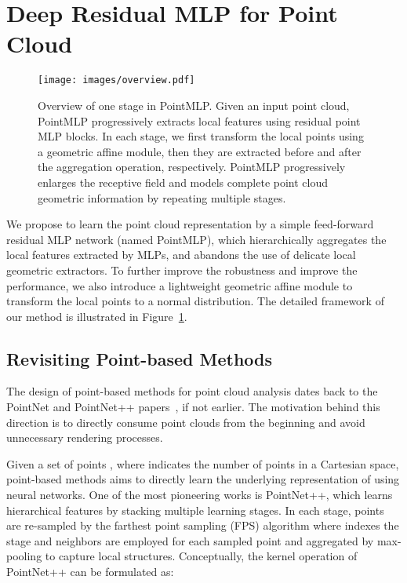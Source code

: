 \documentclass{article} \usepackage{iclr2022_conference,times}
\begin{document}
\section{Deep Residual MLP for Point Cloud}
\label{sec:pointmlp}

\begin{figure}
    \centering
    \texttt{[image: images/overview.pdf]}
    \caption{Overview of one stage in PointMLP. Given an input point cloud, PointMLP progressively extracts local features using residual point MLP blocks. In each stage, we first transform the local points using a geometric affine module, then they are extracted before and after the aggregation operation, respectively. PointMLP progressively enlarges the receptive field and models complete point cloud geometric information by repeating multiple stages.}
    \label{fig:architecture}
\end{figure}

We propose to learn the point cloud representation by a simple feed-forward residual MLP network (named PointMLP), which hierarchically aggregates the local features extracted by MLPs, and abandons the use of delicate local geometric extractors. To further improve the robustness and improve the performance, we also introduce a lightweight geometric affine module to transform the local points to a normal distribution. The detailed framework of our method is illustrated in Figure~\ref{fig:architecture}.



\subsection{Revisiting Point-based Methods}
The design of point-based methods for point cloud analysis dates back to the PointNet and PointNet++ papers~\citep{qi2017pointnet, qi2017pointnet++}, if not earlier. The motivation behind this direction is to directly consume point clouds from the beginning and avoid unnecessary rendering processes.  

Given a set of points , where  indicates the number of points in a   Cartesian space, point-based methods aims to directly learn the underlying representation  of  using neural networks. One of the most pioneering works is PointNet++, which learns hierarchical features by stacking multiple learning stages. In each stage,  points are re-sampled by the farthest point sampling (FPS) algorithm where  indexes the stage and  neighbors are employed for each sampled point and aggregated by max-pooling to capture local structures. Conceptually, the kernel operation of PointNet++ can be formulated as:
\end{document}
